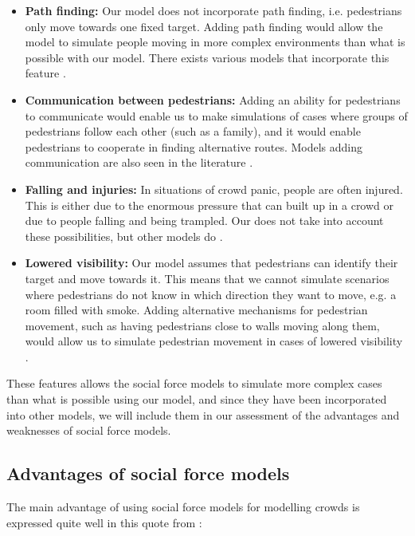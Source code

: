 \begin{itemize}
    \item \textbf{Path finding:} Our model does not incorporate path 
        finding, i.e. pedestrians only move towards one fixed target. Adding 
        path finding would allow the model to simulate people moving in more 
        complex environments than what is possible with our model. There 
        exists various models that incorporate this feature \cite{HiDAC}.
 
    \item \textbf{Communication between pedestrians:} Adding an ability for 
        pedestrians to communicate would enable us to make simulations of 
        cases where groups of pedestrians follow each other (such as a 
        family), and it would enable pedestrians to cooperate in finding 
        alternative routes. Models adding communication are also seen in the 
        literature \cite{HiDAC}.

    \item \textbf{Falling and injuries:} In situations of crowd panic, people 
        are often injured. This is either due to the enormous pressure that 
        can built up in a crowd or due to people falling and being trampled.  
        Our does not take into account these possibilities, but other models 
        do \cite{HiDAC}.

    \item \textbf{Lowered visibility:} Our model assumes that pedestrians can 
        identify their target and move towards it. This means that we cannot 
        simulate scenarios where pedestrians do not know in which direction 
        they want to move, e.g. a room filled with smoke. Adding alternative 
        mechanisms for pedestrian movement, such as having pedestrians close 
        to walls moving along them, would allow us to simulate pedestrian 
        movement in cases of lowered visibility \cite{HelbingNew}.
\end{itemize}

These features allows the social force models to simulate more complex cases 
than what is possible using our model, and since they have been incorporated 
into other models, we will include them in our assessment of the advantages 
and weaknesses  of social force models.

\subsection{Advantages of social force models}
The main advantage of using social force models for modelling crowds is 
expressed quite well in this quote from \cite{self-org}:

